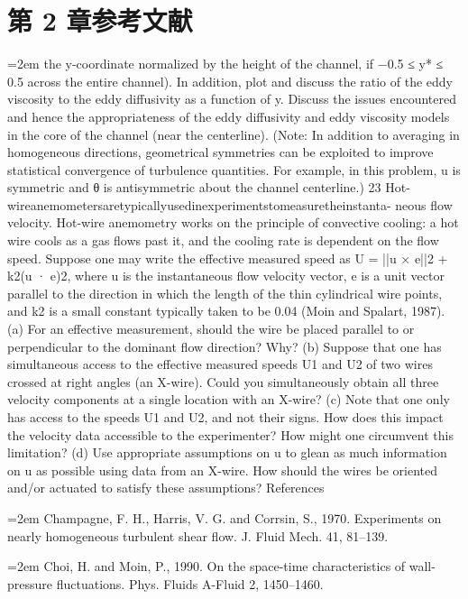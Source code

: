 \documentclass[12pt,a4paper,openany,fontset=none]{ctexbook}
\begin{document}
\section*{第 2 章参考文献}
\par\hangindent=2em the y-coordinate normalized by the height of the channel, if −0.5 ≤ y* ≤ 0.5 across the entire channel). In addition, plot and discuss the ratio of the eddy viscosity to the eddy diffusivity as a function of y. Discuss the issues encountered and hence the appropriateness of the eddy diffusivity and eddy viscosity models in the core of the channel (near the centerline). (Note: In addition to averaging in homogeneous directions, geometrical symmetries can be exploited to improve statistical convergence of turbulence quantities. For example, in this problem, u is symmetric and θ is antisymmetric about the channel centerline.) 23 Hot-wireanemometersaretypicallyusedinexperimentstomeasuretheinstanta- neous flow velocity. Hot-wire anemometry works on the principle of convective cooling: a hot wire cools as a gas flows past it, and the cooling rate is dependent on the flow speed. Suppose one may write the effective measured speed as U =   ||u × e||2 + k2(u · e)2, where u is the instantaneous flow velocity vector, e is a unit vector parallel to the direction in which the length of the thin cylindrical wire points, and k2 is a small constant typically taken to be 0.04 (Moin and Spalart, 1987). (a) For an effective measurement, should the wire be placed parallel to or perpendicular to the dominant flow direction? Why? (b) Suppose that one has simultaneous access to the effective measured speeds U1 and U2 of two wires crossed at right angles (an X-wire). Could you simultaneously obtain all three velocity components at a single location with an X-wire? (c) Note that one only has access to the speeds U1 and U2, and not their signs. How does this impact the velocity data accessible to the experimenter? How might one circumvent this limitation? (d) Use appropriate assumptions on u to glean as much information on u as possible using data from an X-wire. How should the wires be oriented and/or actuated to satisfy these assumptions? References
\par\hangindent=2em Champagne, F. H., Harris, V. G. and Corrsin, S., 1970. Experiments on nearly homogeneous turbulent shear flow. J. Fluid Mech. 41, 81–139.
\par\hangindent=2em Choi, H. and Moin, P., 1990. On the space-time characteristics of wall-pressure fluctuations. Phys. Fluids A-Fluid 2, 1450–1460.
\end{document}

